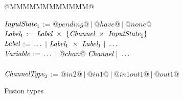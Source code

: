
\newcommand\nextStep[5]{\big((#1,~#2),~(#3,~#4),~#5 \big)}

\begin{figure}

\begin{tabbing}
@MMMMMMMMMMMM@   \TABDEF \kill

$\textit{InputState}_1$ \> := \> $@pending@ ~|~ @have@ ~|~ @none@$
\\
$\textit{Label}_1$ \> := \> $\textit{Label}~\times~\{\textit{Channel} ~\times~ \textit{InputState}_1\}$ \\
$\textit{Label}$   \> := \> $\ldots ~|~\textit{Label}_1~\times~\textit{Label}_1 ~|~ \ldots$ \\
$\textit{Variable}$     \> := \> $\ldots ~|~@chan@~\textit{Channel} ~|~ \ldots$ \\
\\

$\textit{ChannelType}_2$   \> := \> $@in2@~|~@in1@~|~@in1out1@~|~@out1@$ \\
\end{tabbing}

\caption{Fusion types}
\label{fig:Fusion:Types}
\end{figure}

